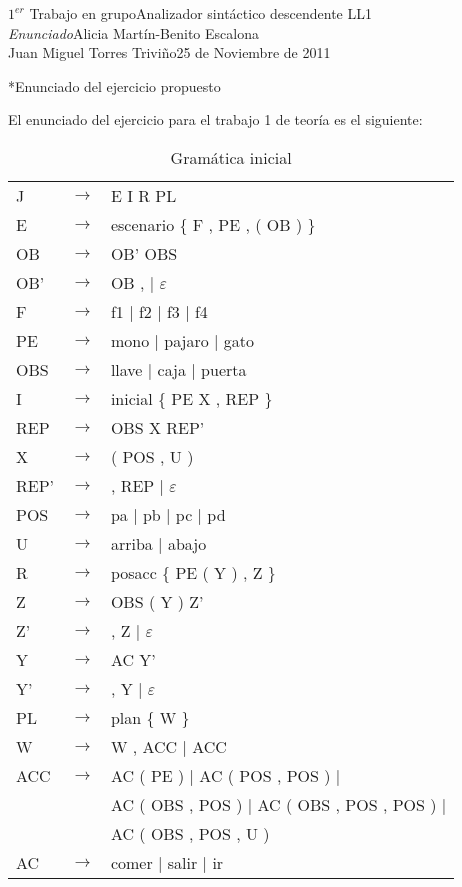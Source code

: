 \documentclass[11pt,a4paper,spanish,twoside]{book}
\makeatletter
\renewcommand{\section}{
  \@startsection{section}{1}{0mm}{\baselineskip}
  {2.5mm}{\Large\bf}
}
\theoremstyle{plain} \newtheorem{nota}{Nota}
\makeatother
\begin{document}
{$1^{er}$ Trabajo en grupo}{Analizador sintáctico descendente LL1\\
\emph{Enunciado}}{Alicia Martín-Benito Escalona\\
Juan Miguel Torres Triviño}{25 de Noviembre de 2011}  


\section*{Enunciado del ejercicio propuesto}
 
El enunciado del ejercicio para el trabajo 1 de teoría es el siguiente:\\
\begin{table}[!ht]
  \centering
  \begin{tabular}{lll}
    \hline
    J   & $\to$ & E I R PL\\
    E   & $\to$ & escenario \{ F , PE , ( OB ) \}\\
    OB  & $\to$ & OB' OBS\\
    OB' & $\to$ & OB , | $\varepsilon$\\
    F   & $\to$ & f1 | f2 | f3 | f4\\
    PE  & $\to$ & mono | pajaro | gato\\
    OBS & $\to$ & llave | caja | puerta\\
    I   & $\to$ & inicial \{ PE X , REP \}\\
    REP  & $\to$ & OBS X REP'\\
    X    & $\to$ & ( POS , U )\\
    REP' & $\to$ & , REP | $\varepsilon$\\
    POS & $\to$ & pa | pb | pc | pd\\
    U   & $\to$ & arriba | abajo\\
    R   & $\to$ & posacc \{ PE ( Y ) , Z \}\\
    Z    & $\to$ & OBS ( Y ) Z'\\
    Z'   & $\to$ & , Z | $\varepsilon$\\
    Y    & $\to$ & AC Y'\\
    Y'   & $\to$ & , Y | $\varepsilon$\\
    PL  & $\to$ & plan \{ W \}\\
    W   & $\to$ & W , ACC | ACC\\
    ACC & $\to$ & AC ( PE ) | AC ( POS , POS ) |\\
        &       & AC ( OBS , POS ) | AC ( OBS , POS , POS ) |\\
        &       & AC ( OBS , POS , U )\\
    AC  & $\to$ & comer | salir | ir\\
    \hline
  \end{tabular}
  \caption{Gramática inicial}\label{G1I}
\end{table}
\end{document}
